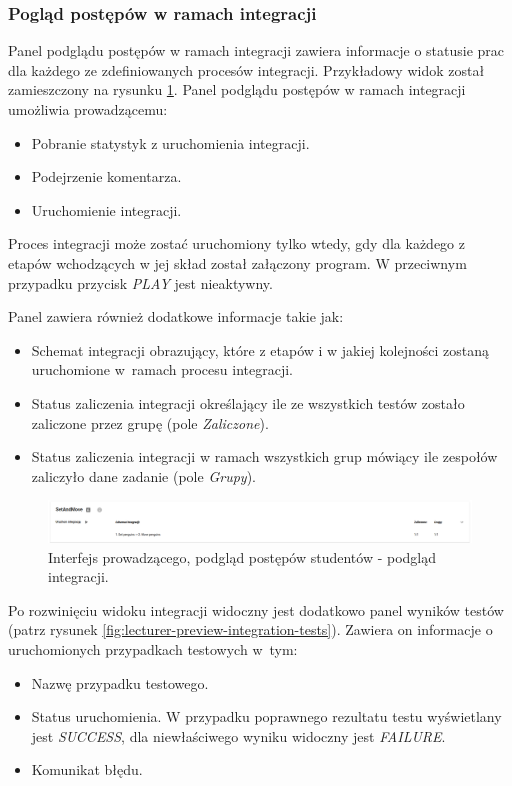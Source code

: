 \subsubsection{Pogląd postępów w ramach integracji}

Panel podglądu postępów w ramach integracji zawiera informacje o statusie prac dla każdego ze zdefiniowanych procesów integracji.
Przykładowy widok został zamieszczony na rysunku \ref{fig:lecturer-preview-integration}.
Panel podglądu postępów w ramach integracji umożliwia prowadzącemu:
\begin {itemize}
    \item Pobranie statystyk z uruchomienia integracji.
    \item Podejrzenie komentarza.
    \item Uruchomienie integracji.
\end {itemize}
Proces integracji może zostać uruchomiony tylko wtedy, gdy dla każdego z etapów wchodzących w jej skład został załączony program.
W przeciwnym przypadku przycisk \textit{PLAY} jest nieaktywny.

Panel zawiera również dodatkowe informacje takie jak:
\begin{itemize}
    \item Schemat integracji obrazujący, które z etapów i w jakiej kolejności zostaną uruchomione w~ramach procesu integracji.
    \item Status zaliczenia integracji określający ile ze wszystkich testów zostało zaliczone przez grupę (pole \textit{Zaliczone}).
    \item Status zaliczenia integracji w ramach wszystkich grup mówiący ile zespołów zaliczyło dane zadanie (pole \textit{Grupy}).
\end{itemize}

\begin{figure}[h]
    \centering
    \includegraphics[width = 15cm]{chapter04/lecturer_preview_integration.png}
    \caption{Interfejs prowadzącego, podgląd postępów studentów - podgląd integracji.}
    \label{fig:lecturer-preview-integration}
\end{figure}

Po rozwinięciu widoku integracji widoczny jest dodatkowo panel wyników testów (patrz rysunek \ref{fig:lecturer-preview-integration-tests}).
Zawiera on informacje o uruchomionych przypadkach testowych w~tym:
\begin{itemize}
    \item Nazwę przypadku testowego.
    \item Status uruchomienia. W przypadku poprawnego rezultatu testu wyświetlany jest \textit{SUCCESS}, dla niewłaściwego wyniku widoczny jest \textit{FAILURE}.
    \item Komunikat błędu.
\end{itemize}

